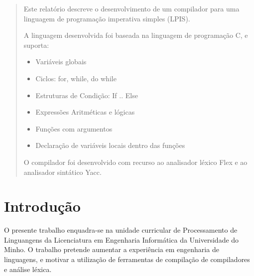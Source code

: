 \documentclass[a4paper,10pt]{report}
\begin{document}


\begin{abstract}
Este relatório descreve o desenvolvimento de um compilador para uma linguagem de programação imperativa simples (LPIS). 

A linguagem desenvolvida foi baseada na linguagem de programação C, e suporta:
\begin{itemize}
  \item Variáveis globais
  \item Ciclos: for, while, do while
  \item Estruturas de Condição: If .. Else
  \item Expressões Aritméticas e lógicas
  \item Funções com argumentos
  \item Declaração de variáveis locais dentro das funções
\end{itemize}
O compilador foi desenvolvido com recurso ao analisador léxico Flex e ao analisador sintático Yacc.

\end{abstract}
\tableofcontents
{}


\chapter{Introdução}
\label{cap:intro}
O presente trabalho enquadra-se na unidade curricular de Processamento de Linguangens da Licenciatura em Engenharia Informática da Universidade do Minho. O trabalho pretende aumentar a experiência em engenharia de linguagens, e motivar a utilização de ferramentas de compilação de compiladores e análise léxica.
\end{document}
